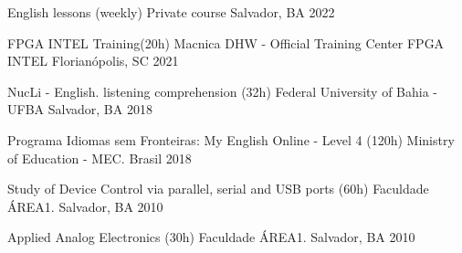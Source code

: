 

\begin{cvhonors}

\cvhonor
  {English lessons (weekly)} %
  {Private course} %
  {Salvador, BA} %
  {2022} %

\cvhonor
  {FPGA INTEL Training(20h)} %
  {Macnica DHW - Official Training Center FPGA INTEL} %
  {Florianópolis, SC} %
  {2021} %

\cvhonor
  {NucLi - English. listening comprehension (32h)} %
  {Federal University of Bahia - UFBA} %
  {Salvador, BA} %
  {2018} %
    
\cvhonor
  {Programa Idiomas sem Fronteiras: My English Online - Level 4 (120h) } %
  {Ministry of Education - MEC.} %
  {Brasil} %
  {2018} %

\cvhonor
  {Study of Device Control via parallel, serial and USB ports (60h)} %
  {Faculdade ÁREA1.} %
  {Salvador, BA} %
  {2010} %

\cvhonor
  {Applied Analog Electronics (30h)} %
  {Faculdade ÁREA1.} %
  {Salvador, BA} %
  {2010} %

\end{cvhonors}
